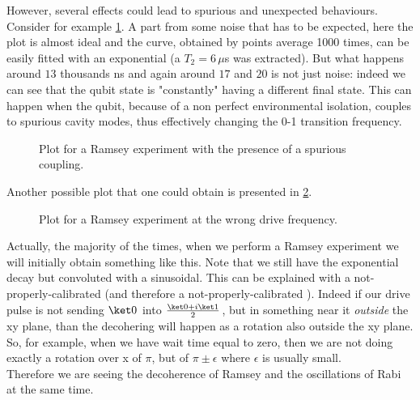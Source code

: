 However, several effects could lead to spurious and unexpected behaviours.
Consider for example \cref{fig:spurious_coupling_ramsey}.
A part from some noise that has to be expected, here the plot is almost ideal and the curve, obtained by points average 1000 times, can be easily fitted with an exponential (a $T_2=6\,\mu$s was extracted). 
But what happens around $13$ thousands ns and again around $17$ and $20$ is not just noise: indeed we can see that the qubit state is "constantly" having a different final state. This can happen when the qubit, because of a non perfect environmental isolation, couples to spurious cavity modes, thus effectively changing the 0-1 transition frequency.

\begin{figure}[ht]
    \caption{Plot for a Ramsey experiment with the presence of a spurious coupling.}
    \label{fig:spurious_coupling_ramsey}
\end{figure}

Another possible plot that one could obtain is presented in \cref{fig:ramsey_experiment_wrong_freq}.
\begin{figure}[ht]
    \caption{Plot for a Ramsey experiment at the wrong drive frequency.}
    \label{fig:ramsey_experiment_wrong_freq}
\end{figure}
Actually, the majority of the times, when we perform a Ramsey experiment we will initially obtain something like this. 
Note that we still have the exponential decay but convoluted with a sinusoidal.
This can be explained with a not-properly-calibrated \pipulse (and therefore a not-properly-calibrated \pihpulse).
Indeed if our drive pulse is not sending $\ket 0$ into $\frac{\ket 0 + i\ket 1}{2}$, but in something near it \textit{outside} the xy plane, than the decohering will happen as a rotation also outside the xy plane.
So, for example, when we have wait time equal to zero, then we are not doing exactly a rotation over x of $\pi$, but of $\pi\pm\epsilon$ where $\epsilon$ is usually small.\\
Therefore we are seeing the decoherence of Ramsey and the oscillations of Rabi at the same time.

